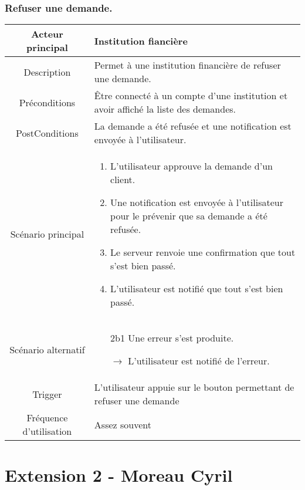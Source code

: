 \documentclass{article}
\begin{document}
\subsubsection{Refuser une demande.}
\begin{table}[h]
   \begin{tabular}{|c|p{10cm}|}
      \hline
      Acteur principal&Institution fiancière\\
      \hline
      Description&Permet à une institution financière de refuser une demande.\\
      \hline
      Préconditions&Être connecté à un compte d'une institution et avoir affiché la liste des demandes.\\
      \hline
      PostConditions&La demande a été refusée et une notification est envoyée à l'utilisateur.\\
      \hline
      Scénario principal& 
            \begin{enumerate}
               \item L'utilisateur approuve la demande d'un client.
               \item Une notification est envoyée à l'utilisateur pour le prévenir que sa demande a été refusée.
               \item Le serveur renvoie une confirmation que tout s'est bien passé.
               \item L'utilisateur est notifié que tout s'est bien passé.
            \end{enumerate}     \\
      \hline
      Scénario alternatif&
            \begin{itemize}
               \item[2b1] Une erreur s'est produite.
               \item[$\rightarrow$] L'utilisateur est notifié de l'erreur.  
            \end{itemize}\\
      \hline
      Trigger&L'utilisateur appuie sur le bouton permettant de refuser une demande\\
      \hline
      Fréquence d'utilisation&Assez souvent\\
      \hline
   \end{tabular}
\end{table}

\newpage

\section{Extension 2 - Moreau Cyril}
\end{document}

